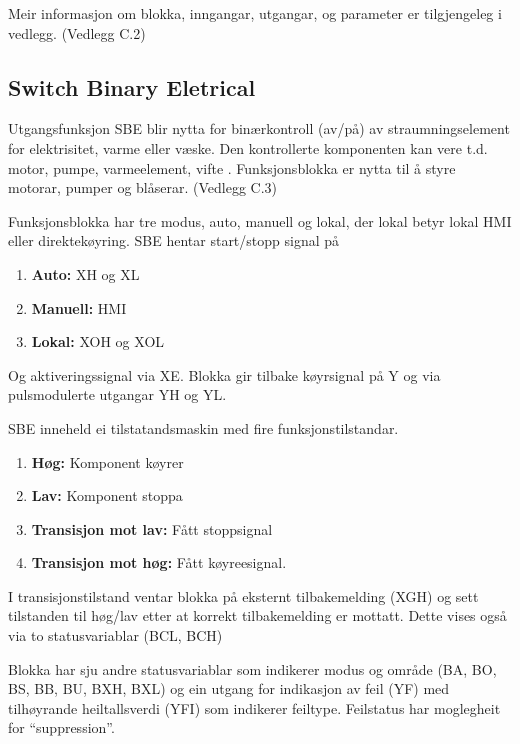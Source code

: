 Meir informasjon om blokka, inngangar, utgangar, og parameter er tilgjengeleg i vedlegg. (Vedlegg C.2)

\newpage

\subsection{Switch Binary Eletrical} 

Utgangsfunksjon \gls{SBE} blir nytta for binærkontroll (av/på) av straumningselement for elektrisitet, varme eller væske. 
Den kontrollerte komponenten kan vere t.d. motor, pumpe, varmeelement, vifte \citep{IEC-63131}. \newline
Funksjonsblokka er nytta til å styre motorar, pumper og blåserar. (Vedlegg C.3)

Funksjonsblokka har tre modus, auto, manuell og lokal, der lokal betyr lokal HMI eller direktekøyring.
\gls{SBE} hentar start/stopp signal på
\begin{enumerate}
    \item \textbf{Auto:}        XH og XL  
    \item \textbf{Manuell:}     HMI
    \item \textbf{Lokal:}       XOH og XOL
\end{enumerate}
Og aktiveringssignal via XE. \newline
Blokka gir tilbake køyrsignal på Y og via pulsmodulerte utgangar YH og YL.

\gls{SBE} inneheld ei tilstatandsmaskin med fire funksjonstilstandar. 
\begin{enumerate}
    \item \textbf{Høg:}                 Komponent køyrer
    \item \textbf{Lav:}                 Komponent stoppa
    \item \textbf{Transisjon mot lav:}  Fått stoppsignal
    \item \textbf{Transisjon mot høg:}  Fått køyreesignal.
\end{enumerate}

I transisjonstilstand ventar blokka på eksternt tilbakemelding (XGH) 
og sett tilstanden til høg/lav etter at korrekt tilbakemelding er mottatt.
Dette vises også via to statusvariablar (BCL, BCH)

Blokka har sju andre statusvariablar som indikerer modus og område (BA, BO, BS, BB, BU, BXH, BXL) og
ein utgang for indikasjon av feil (YF) med tilhøyrande heiltallsverdi (YFI) som indikerer feiltype. \newline
Feilstatus har moglegheit for ``suppression''.

